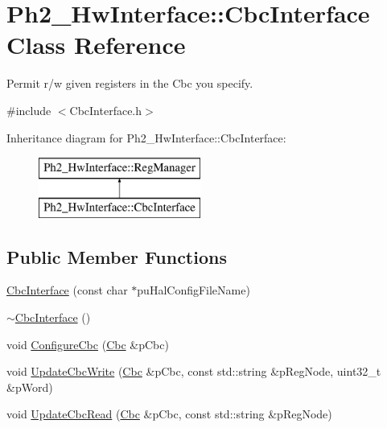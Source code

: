 \hypertarget{class_ph2___hw_interface_1_1_cbc_interface}{\section{Ph2\-\_\-\-Hw\-Interface\-:\-:Cbc\-Interface Class Reference}
\label{class_ph2___hw_interface_1_1_cbc_interface}
}


Permit r/w given registers in the Cbc you specify.  




{\ttfamily \#include $<$Cbc\-Interface.\-h$>$}

Inheritance diagram for Ph2\-\_\-\-Hw\-Interface\-:\-:Cbc\-Interface\-:\begin{figure}[H]
\begin{center}
\leavevmode
\includegraphics[height=2.000000cm]{class_ph2___hw_interface_1_1_cbc_interface}
\end{center}
\end{figure}
\subsection*{Public Member Functions}
\begin{DoxyCompactItemize}
\item 
\hyperlink{class_ph2___hw_interface_1_1_cbc_interface_a3ddefe5549da06a7d26fee1502a792b4}{Cbc\-Interface} (const char $\ast$pu\-Hal\-Config\-File\-Name)
\item 
\hyperlink{class_ph2___hw_interface_1_1_cbc_interface_a1f0ab7d7cf7783a0fe275e8e1d7e5a49}{$\sim$\-Cbc\-Interface} ()
\item 
void \hyperlink{class_ph2___hw_interface_1_1_cbc_interface_af5cf4eb5b7134835f00349cb19f35c56}{Configure\-Cbc} (\hyperlink{class_ph2___hw_description_1_1_cbc}{Cbc} \&p\-Cbc)
\item 
void \hyperlink{class_ph2___hw_interface_1_1_cbc_interface_a498d71b5709e0524b8e9dc50b92d1424}{Update\-Cbc\-Write} (\hyperlink{class_ph2___hw_description_1_1_cbc}{Cbc} \&p\-Cbc, const std\-::string \&p\-Reg\-Node, uint32\-\_\-t \&p\-Word)
\item 
void \hyperlink{class_ph2___hw_interface_1_1_cbc_interface_ab08ea1de98fe120098a4f5c52e017393}{Update\-Cbc\-Read} (\hyperlink{class_ph2___hw_description_1_1_cbc}{Cbc} \&p\-Cbc, const std\-::string \&p\-Reg\-Node)
\end{DoxyCompactItemize}
